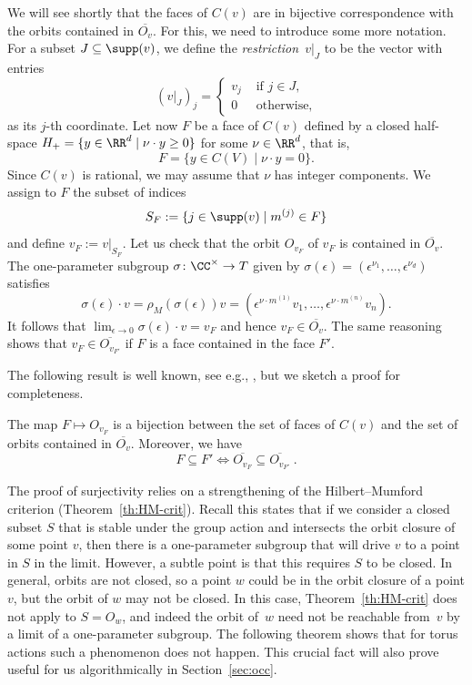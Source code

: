 We will see shortly that the faces of $C(v)$ are in bijective correspondence with the orbits contained in $\overline{O_v}$.
For this, we need to introduce some more notation.
For a subset $J \subseteq \supp(v)$, we define the \emph{restriction}~$v|_{J}$ to be the vector with entries
\[
(v|_{J})_j = \begin{cases}
 v_j & \mbox{ if } j \in J,\\
 0 & \mbox{ otherwise,}
 \end{cases}
\] as its $j$-th coordinate.
Let now $F$ be a face of $C(v)$ defined by a closed half-space $H_+ = \{ y \in \RR^d \;|\; \nu \cdot y \geq 0 \}$ for some $\nu\in\RR^d$, that is,
\[
 F= \{ y\in C(V) \mid \nu \cdot y = 0 \}.
\]
Since $C(v)$ is rational, we may assume that $\nu$ has integer components.
We assign to $F$ the subset of indices
\[
 S_F := \{ j \in \supp(v) \mid m^{(j)} \in F \}
\]
and define $v_F := v|_{S_F}$.
Let us check that the orbit $O_{v_F}$ of $v_F$ is contained in $\overline{O_v}$.
The one-parameter subgroup $\sigma\colon \CC^\times \to T$ given by $\sigma(\epsilon) = (\epsilon^{\nu_1},\ldots,\epsilon^{\nu_d})$ satisfies
\begin{equation}\label{eq:SEV}
 \sigma(\epsilon) \cdot v = \rho_M(\sigma(\epsilon)) v = (\epsilon^{\nu \cdot m^{(1)}} v_1,\ldots,\epsilon^{\nu \cdot m^{(n)}} v_n) .
\end{equation}
It follows that $\lim_{\epsilon\to 0} \sigma(\epsilon) \cdot v = v_F$ and hence $v_F \in \overline{O_v}$.
The same reasoning shows that $v_{F} \in \overline{O_{v_{F'}}}$ if $F$ is a face contained in the face $F'$.


The following result is well known, see e.g., \cite[Example~1.3]{Popov-occ}, but we sketch a proof for completeness.

\begin{proposition} \label{prop:orbit-structure}
The map $F\mapsto O_{v_F}$ is a bijection between the set of faces of $C(v)$ and
the set of orbits contained in $\overline{O_v}$. Moreover, we have
$$
  F\subseteq F' \Longleftrightarrow \overline{O_{v_F}}\subseteq\overline{O_{v_{F'}}}\ .
$$
\end{proposition}

The proof of surjectivity relies on a strengthening of the Hilbert--Mumford criterion (Theorem~\ref{th:HM-crit}).
Recall this states that if we consider a closed subset $S$ that is stable under the group action and intersects the orbit closure of some point $v$,
then there is a one-parameter subgroup that will drive $v$ to a point in $S$ in the limit.
However, a subtle point is that this requires $S$ to be closed. In general, orbits are not closed, so a point $w$ could be in the orbit closure of a point $v$, but the orbit of $w$ may not be closed.
In this case, Theorem~\ref{th:HM-crit} does not apply to $S=O_w$, and indeed the orbit of~$w$ need not be reachable from~$v$ by a limit of a one-parameter subgroup.
The following theorem shows that for torus actions such a phenomenon does not happen.
This crucial fact will also prove useful for us algorithmically in Section~\ref{sec:occ}.


